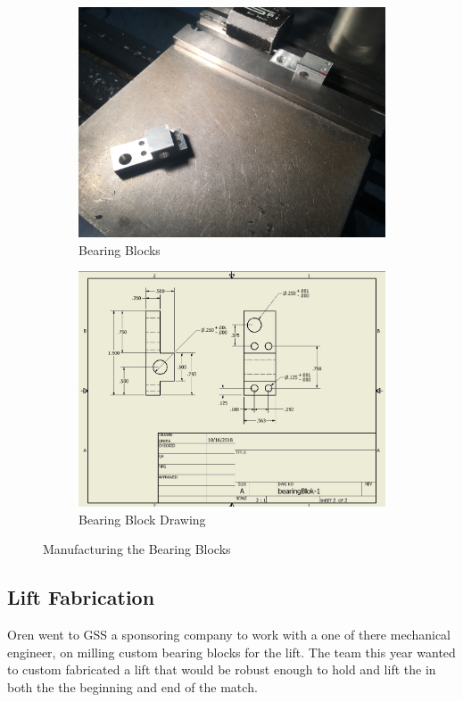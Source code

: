 \documentclass{article}
\begin{document}
\begin{figure}[h!]
\centering
\begin{subfigure}{.45\textwidth}
  \centering
  \includegraphics[width=\textwidth]{09_10-29/images/bearingblock.JPG}
  \caption{Bearing Blocks}
  \label{fig:Bearings}
 \end{subfigure}
\begin{subfigure}{.45\textwidth}
  \centering
  \includegraphics[width=\textwidth]{09_10-29/images/Drawings.jpg}
  \caption{Bearing Block Drawing}
  \label{fig:BearingDrawing}
  \end{subfigure}
  \caption{Manufacturing the Bearing Blocks}
  \end{figure}
  
\subsection{Lift Fabrication}
Oren went to GSS a sponsoring company to work with a one of there mechanical engineer, on milling custom bearing blocks for the lift. The team this year wanted to custom fabricated a lift that would be robust enough to hold and lift the in both the the beginning and end of the match. 
\end{document}
